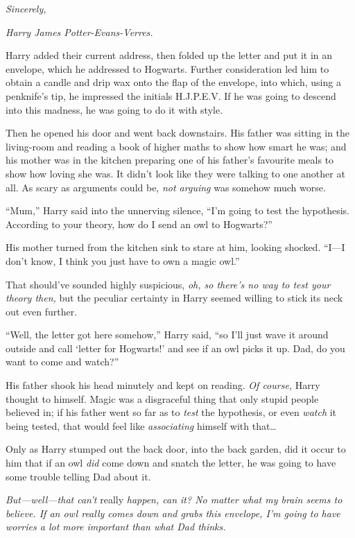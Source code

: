 \emph{Sincerely,}

\emph{Harry James Potter-Evans-Verres.}

Harry added their current address, then folded up the letter and put it
in an envelope, which he addressed to Hogwarts. Further consideration
led him to obtain a candle and drip wax onto the flap of the envelope,
into which, using a penknife's tip, he impressed the initials H.J.P.E.V.
If he was going to descend into this madness, he was going to do it with
style.

Then he opened his door and went back downstairs. His father was sitting
in the living-room and reading a book of higher maths to show how smart
he was; and his mother was in the kitchen preparing one of his father's
favourite meals to show how loving she was. It didn't look like they
were talking to one another at all. As scary as arguments could be,
\emph{not arguing} was somehow much worse.

``Mum,'' Harry said into the unnerving silence, ``I'm going to test the
hypothesis. According to your theory, how do I send an owl to
Hogwarts?''

His mother turned from the kitchen sink to stare at him, looking
shocked. ``I---I don't know, I think you just have to own a magic owl.''

That should've sounded highly suspicious, \emph{oh, so there's no way to
test your theory then,} but the peculiar certainty in Harry seemed
willing to stick its neck out even further.

``Well, the letter got here somehow,'' Harry said, ``so I'll just wave
it around outside and call `letter for Hogwarts!' and see if an owl
picks it up. Dad, do you want to come and watch?''

His father shook his head minutely and kept on reading. \emph{Of
course,} Harry thought to himself. Magic was a disgraceful thing that
only stupid people believed in; if his father went so far as to
\emph{test} the hypothesis, or even \emph{watch} it being tested, that
would feel like \emph{associating} himself with that\ldots{}

Only as Harry stumped out the back door, into the back garden, did it
occur to him that if an owl \emph{did} come down and snatch the letter,
he was going to have some trouble telling Dad about it.

\emph{But---well---that can't} really \emph{happen, can it? No matter
what my brain seems to believe. If an owl really comes down and grabs
this envelope, I'm going to have worries a lot more important than what
Dad thinks.}

